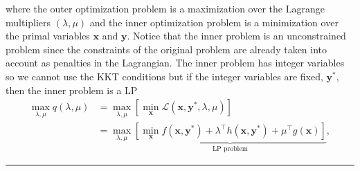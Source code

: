 where the outer optimization problem is a maximization over the Lagrange multipliers $\left(\lambda,\mu\right)$ and the inner optimization problem is a minimization over the primal variables $\mathbf{x}$ and $\mathbf{y}$. Notice that the inner problem is an unconstrained problem since the constraints of the original problem are already taken into account as penalties in the Lagrangian. The inner problem has integer variables so we cannot use the KKT conditions but if the integer variables are fixed, $\mathbf{y}^{*}$, then the inner problem is a LP
\begin{align}
    \max_{\lambda,\mu} q(\lambda,\mu) &=\max_{\lambda,\mu}\left[\min_{\mathbf{x}}\mathcal{L}(\mathbf{x}, \mathbf{y}^{*},\lambda,\mu)\right] \\
    &= \max_{\lambda,\mu}\underbrace{\left[\min_{\mathbf{x}}f(\mathbf{x}, \mathbf{y}^{*}) + \lambda^{\intercal}h(\mathbf{x}, \mathbf{y}^{*}) + \mu^{\intercal}g(\mathbf{x})\right]}_{\textrm{LP problem}} ,
\end{align}
  \vspace{6pt}
    \hrule
